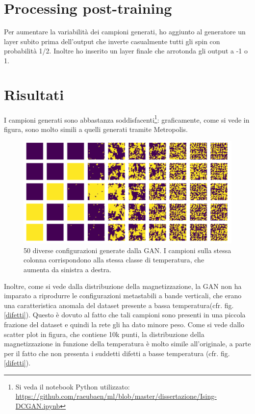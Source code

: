 \documentclass[Lau, noexaminfo, oneside]{sapthesis} %
\begin{document}
\section{Processing post-training}
Per aumentare la variabilità dei campioni generati, ho aggiunto al generatore un layer subito prima dell'output che inverte casualmente tutti gli spin con probabilità 1/2. Inoltre ho inserito un layer finale che arrotonda gli output a -1 o 1.
\section{Risultati}
I campioni generati sono abbastanza soddisfacenti\footnote{Si veda il notebook Python utilizzato: \url{https://github.com/raeubaen/ml/blob/master/dissertazione/Ising-DCGAN.ipynb}}: graficamente, come si vede in figura, sono molto simili a quelli generati tramite Metropolis.
\begin{figure}[H]
\includegraphics[width=\textwidth]{ising.png}
\centering
\caption{50 diverse configurazioni generate dalla GAN. I campioni sulla stessa colonna corrispondono alla stessa classe di temperatura, che aumenta da sinistra a destra.}
\end{figure}
Inoltre, come si vede dalla distribuzione della magnetizzazione, la GAN non ha imparato a riprodurre le configurazioni metastabili a bande verticali, che erano una caratteristica anomala del dataset presente a bassa temperatura(cfr. fig. \ref{difetti}). Questo è dovuto al fatto che tali campioni sono presenti in una piccola frazione del dataset e quindi la rete gli ha dato minore peso.
Come si vede dallo scatter plot in figura, che contiene 10k punti, la distribuzione della magnetizzazione in funzione della temperatura è molto simile all'originale, a parte per il fatto che non presenta i suddetti difetti a basse temperatura (cfr. fig. \ref{difetti}).
\end{document}
